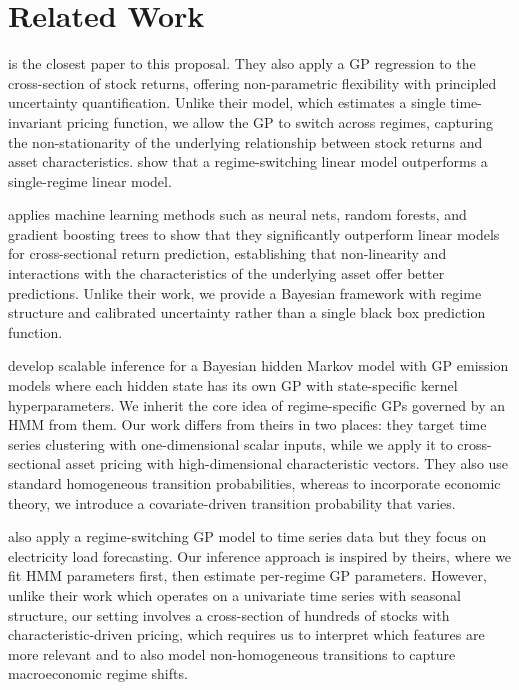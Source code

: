 \documentclass[11pt]{article}
\begin{document}
\section{Related Work}
\cite{filipovic_empirical_2025} is the closest paper to this proposal. They also apply a GP regression to the cross-section of stock returns, offering non-parametric flexibility with principled uncertainty quantification. Unlike their model, which estimates a single time-invariant pricing function, we allow the GP to switch across regimes, capturing the non-stationarity of the underlying relationship between stock returns and asset characteristics. \cite{guidolin_size_2008} show that a regime-switching linear model outperforms a single-regime linear model.

\cite{gu_empirical_2020} applies machine learning methods such as neural nets, random forests, and gradient boosting trees to show that they significantly outperform linear models for cross-sectional return prediction, establishing that non-linearity and interactions with the characteristics of the underlying asset offer better predictions. Unlike their work, we provide a Bayesian framework with regime structure and calibrated uncertainty rather than a single black box prediction function. 

\cite{jung_scalable_2022} develop scalable inference for a Bayesian hidden Markov model with GP emission models where each hidden state has its own GP with state-specific kernel hyperparameters. We inherit the core idea of regime-specific GPs governed by an HMM from them. Our work differs from theirs in two places: they target time series clustering with one-dimensional scalar inputs, while we apply it to cross-sectional asset pricing with high-dimensional characteristic vectors. They also use standard homogeneous transition probabilities, whereas to incorporate economic theory, we introduce a covariate-driven transition probability that varies.

\cite{li_hidden_2023} also apply a regime-switching GP model to time series data but they focus on electricity load forecasting. Our inference approach is inspired by theirs, where we fit HMM parameters first, then estimate per-regime GP parameters. However, unlike their work which operates on a univariate time series with seasonal structure, our setting involves a cross-section of hundreds of stocks with characteristic-driven pricing, which requires us to interpret which features are more relevant and to also model non-homogeneous transitions to capture macroeconomic regime shifts. 



\pagebreak


\end{document}
